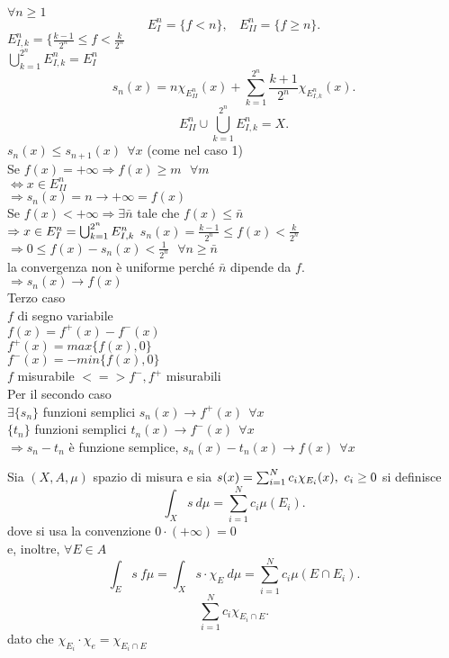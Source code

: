 \documentclass[12px]{article}
\begin{document}
\begin{dimo}
   $\forall n\geq 1$
    \[
	    E_I^n = \{f < n\},\ \  \ \ E_{II}^n = \{f\geq n\}
   .\] 
   $E^n_{I,k} =\{\frac{k-1}{2^n}\leq f < \frac {k}{2^n}$ \\
	   $ \bigcup^{2^n}_{k = 1}E^n_{I,k} = E^n_I$
	   \[
		   s_n(x) = n\chi_{E^n_{II}}(x) + \sum^{2^n}_{k = 1}\frac { k + 1}{2^n}\chi_{E_{I,k}^n}(x)
	   .\] 
	   \[
		   E_{II}^n\cup \bigcup^{2^n}_{k=1}E_{I,k}^n = X
	   .\] 
	   $s_n(x) \leq s_{n+1}(x) \ \ \forall x$ (come nel caso 1)\\
	   Se $f(x) = +\infty \Rightarrow f(x) \geq m\ \ \ \forall m$ \\
	   $ \Leftrightarrow x\in E_{II}^n$\\
	   $ \Rightarrow s_n(x) = n \rightarrow+\infty = f(x)$ \\
	   Se $f(x) < +\infty \Rightarrow \exists \bar n $ tale che $f(x) \leq \bar n$\\
	   $ \Rightarrow x\in E_I^n = \bigcup^{2^n}_{k=1}E^n_{I,k}\\$
	   $s_n(x) = \frac {k-1}{2^n} \leq f(x) < \frac{ k}{2^n}$ \\
	   $ \Rightarrow  0 \leq f(x) - s_n(x) < \frac 1{2^n}\ \ \ \forall n\geq \bar n$ \\
	   la convergenza non è uniforme perché $\bar n$ dipende da  $f$.\\
	   $ \Rightarrow s_n (x) \rightarrow f(x)$\\[10px]
Terzo caso\\
$f$ di segno variabile\\
$f(x) =f^+(x) - f^-(x)$\\
$f^+(x) = max\{f(x),0\}$\\
$f^-(x) = -min\{f(x),0\}$\\
 $f$ misurabile $ <=> f^-, f^+$ misurabili\\
 Per il secondo caso\\
 $\exists \{s_n\}$ funzioni semplici  $s_n(x) \rightarrow f^+(x) \ \ \forall x$\\
 $\{t_n\}$ funzioni semplici $t_n(x) \rightarrow f^-(x) \ \ \forall x$ \\
 $ \Rightarrow s_n - t_n$ è funzione semplice, $s_n(x) - t_n(x) \rightarrow f(x) \ \ \forall x$
\end{dimo}
\begin{defi}
	Sia $(X,A,\mu)$ spazio di misura e sia $s(x) = \sum_{i=1}^{N}c_i\chi_{E_i}(x), \ c_i\geq 0 \\$	
	si definisce 
	\[
	\int_X s \ d\mu = \sum^{N}_{i=1}c_i\mu(E_i)
	.\] 
	dove si usa la convenzione $0 \cdot (+ \infty )= 0$\\
	e, inoltre, $\forall E \in A$
	 \[
	\int_E s \ f\mu = \int_X s\cdot \chi_E \ d\mu = \sum^{N}_{i=1}c_i\mu (E\cap E_i )
	.\] 
	\[
		\sum^{N}_{i=1}c_i\chi_{E_i\cap E}
	.\] 
	dato che $\chi_{E_i}\cdot \chi_e = \chi_{E_i\cap E}$
\end{defi}
\end{document}
